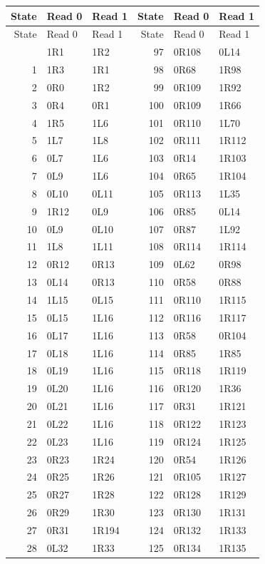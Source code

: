 \begin{longtable}{rll@{\hspace{10mm}}rll}
\toprule
State & Read 0 & Read 1 & State & Read 0 & Read 1\\
\midrule\endfirsthead
\toprule State & Read 0 & Read 1 & State & Read 0 & Read 1\\\midrule\endhead
\bottomrule\endfoot
0 & 1R1 & 1R2 & 97 & 0R108 & 0L14\\
1 & 1R3 & 1R1 & 98 & 0R68 & 1R98\\
2 & 0R0 & 1R2 & 99 & 0R109 & 1R92\\
3 & 0R4 & 0R1 & 100 & 0R109 & 1R66\\
4 & 1R5 & 1L6 & 101 & 0R110 & 1L70\\
5 & 1L7 & 1L8 & 102 & 0R111 & 1R112\\
6 & 0L7 & 1L6 & 103 & 0R14 & 1R103\\
7 & 0L9 & 1L6 & 104 & 0R65 & 1R104\\
8 & 0L10 & 0L11 & 105 & 0R113 & 1L35\\
9 & 1R12 & 0L9 & 106 & 0R85 & 0L14\\
10 & 0L9 & 0L10 & 107 & 0R87 & 1L92\\
11 & 1L8 & 1L11 & 108 & 0R114 & 1R114\\
12 & 0R12 & 0R13 & 109 & 0L62 & 0R98\\
13 & 0L14 & 0R13 & 110 & 0R58 & 0R88\\
14 & 1L15 & 0L15 & 111 & 0R110 & 1R115\\
15 & 0L15 & 1L16 & 112 & 0R116 & 1R117\\
16 & 0L17 & 1L16 & 113 & 0R58 & 0R104\\
17 & 0L18 & 1L16 & 114 & 0R85 & 1R85\\
18 & 0L19 & 1L16 & 115 & 0R118 & 1R119\\
19 & 0L20 & 1L16 & 116 & 0R120 & 1R36\\
20 & 0L21 & 1L16 & 117 & 0R31 & 1R121\\
21 & 0L22 & 1L16 & 118 & 0R122 & 1R123\\
22 & 0L23 & 1L16 & 119 & 0R124 & 1R125\\
23 & 0R23 & 1R24 & 120 & 0R54 & 1R126\\
24 & 0R25 & 1R26 & 121 & 0R105 & 1R127\\
25 & 0R27 & 1R28 & 122 & 0R128 & 1R129\\
26 & 0R29 & 1R30 & 123 & 0R130 & 1R131\\
27 & 0R31 & 1R194 & 124 & 0R132 & 1R133\\
28 & 0L32 & 1R33 & 125 & 0R134 & 1R135\\

\end{longtable}
